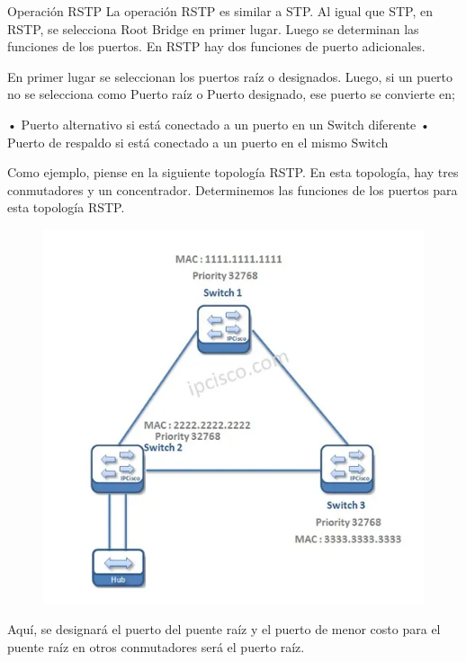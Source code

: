 Operación RSTP
La operación RSTP es similar a STP. Al igual que STP, en RSTP, se selecciona Root Bridge en primer lugar. Luego se determinan las funciones de los puertos. En RSTP hay dos funciones de puerto adicionales.

En primer lugar se seleccionan los puertos raíz o designados. Luego, si un puerto no se selecciona como Puerto raíz o Puerto designado, ese puerto se convierte en;

• Puerto alternativo si está conectado a un puerto en un Switch diferente
• Puerto de respaldo si está conectado a un puerto en el mismo Switch

Como ejemplo, piense en la siguiente topología RSTP. En esta topología, hay tres conmutadores y un concentrador. Determinemos las funciones de los puertos para esta topología RSTP.

\begin{figure}[h]
	\centering
	\includegraphics[width=0.7\linewidth]{screenshot002}
	\caption{}
	\label{fig:screenshot002}
\end{figure}

Aquí, se designará el puerto del puente raíz y el puerto de menor costo para el puente raíz en otros conmutadores será el puerto raíz.

